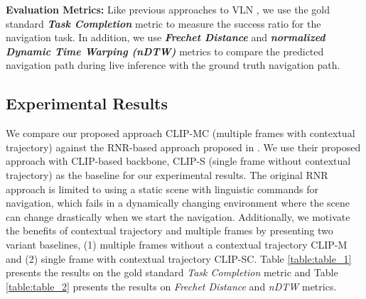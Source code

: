 \documentclass[letterpaper, 10 pt, conference]{ieeeconf}  %
\begin{document}
\textbf{Evaluation Metrics:} Like previous approaches to VLN \cite{schumann-riezler-2022-analyzing, xiang-etal-2020-learning, chen2019touchdown}, we use the gold standard \textbf{\textit{Task Completion}} metric to measure the success ratio for the navigation task. In addition, we use \textbf{\textit{Frechet Distance}} \cite{eifer1994frechet} and \textbf{\textit{normalized Dynamic Time Warping (nDTW)}} \cite{ilharco2019general} metrics to compare the predicted navigation path during live inference with the ground truth navigation path. 

\subsection{Experimental Results}

We compare our proposed approach CLIP-MC (multiple frames with contextual trajectory) against the RNR-based approach proposed in \cite{Rufus_2021}. We use their proposed approach with CLIP-based backbone, CLIP-S (single frame without contextual trajectory) as the baseline for our experimental results. The original RNR approach is limited to using a static scene with linguistic commands for navigation, which fails in a dynamically changing environment where the scene can change drastically when we start the navigation. Additionally, we motivate the benefits of contextual trajectory and multiple frames by presenting two variant baselines, (1) multiple frames without a contextual trajectory CLIP-M and (2) single frame with contextual trajectory CLIP-SC. Table \ref{table:table_1} presents the results on the gold standard \textit{Task Completion} metric and Table \ref{table:table_2} presents the results on \textit{Frechet Distance} and \textit{nDTW} metrics.
\end{document}
